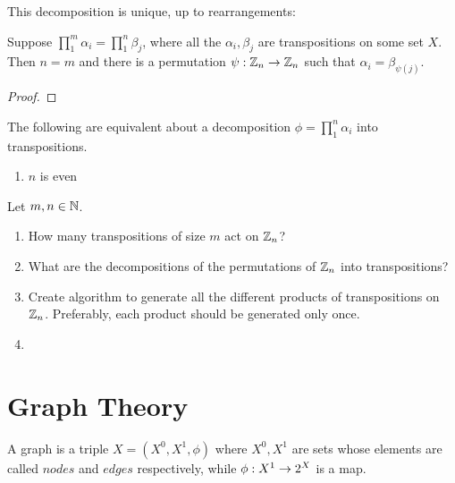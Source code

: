 This decomposition is unique, up to rearrangements:

\begin{theorem}
	Suppose $\prod_1^{m}\alpha_i=\prod_{1}^{n}\beta_j$, where all the $\alpha_i, \beta_j$ are transpositions on some set $X$. Then $n=m$ and there is a permutation $\psi:\mathbb{Z}_n\rightarrow\mathbb{Z}_n$ such that $\alpha_i = \beta_{\psi(j)}$.
\end{theorem}
\begin{proof}
	
\end{proof}

\begin{proposition}
	The following are equivalent about a decomposition $\phi = \prod_{1}^n\alpha_i$ into transpositions.
	
	\begin{enumerate}
		\item $n$ is even
	\end{enumerate}
\end{proposition}

\begin{problem}
	Let $m, n \in \mathbb{N}$.
	\begin{enumerate}
		\item How many transpositions of size $m$ act on $\mathbb{Z}_n$?
		
		\item 	What are the decompositions of the permutations of $\mathbb{Z}_n$ into transpositions?
		
		\item Create algorithm to generate all the different products of transpositions on $\mathbb{Z}_n$. Preferably, each product should be generated only once.
		
		\item  
	\end{enumerate}
	
	
\end{problem}











\section{Graph Theory}

\begin{definition}
	A graph is a triple $X=(X^0, X^1, \phi)$ where $X^0, X^1$ are sets whose elements are called $nodes$ and $edges$ respectively, while $\phi:X^1 \rightarrow 2^X$ is a map. 
\end{definition}

